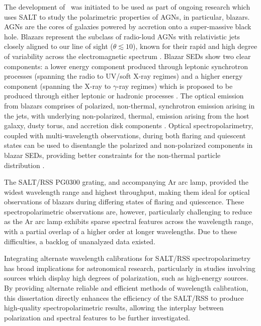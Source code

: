 The development of \stops\ was initiated to be used as part of ongoing research which uses \gls{SALT} to study the polarimetric properties of \glspl{AGN}, in particular, blazars.
\Glspl{AGN} are the cores of galaxies powered by accretion onto a super-massive black hole.
Blazars represent the subclass of radio-loud \glspl{AGN} with relativistic jets closely aligned to our line of sight ($\theta \lesssim 10$\degree), known for their rapid and high degree of variability across the electromagnetic spectrum \citep{Urry_1995}.
Blazar \glspl{SED} show two clear components:
a lower energy component produced through leptonic synchrotron processes (spanning the radio to \gls{UV}/soft X-ray regimes)
and a higher energy component (spanning the X-ray to $\gamma$-ray regimes) which is proposed to be produced through either leptonic or hadronic processes \citep{Bottcher_2013}.
%
The optical emission from blazars comprises of polarized, non-thermal, synchrotron emission arising in the jets, with underlying non-polarized, thermal, emission arising from the host galaxy, dusty torus, and accretion disk components  \citep{Ghisellini_2009}.
Optical spectropolarimetry, coupled with multi-wavelength observations, during both flaring and quiescent states can be used to disentangle the polarized and non-polarized components in blazar \glspl{SED}, providing better constraints for the non-thermal particle distribution \citep{Schutte_COSPAR, Schutte4C0102}.

The \gls{SALT}/\gls{RSS} PG$0300$ grating, and accompanying \gls{Ar} arc lamp, provided the widest wavelength range and highest throughput, making them ideal for optical observations of blazars during differing states of flaring and quiescence.
These spectro\-polarimetric observations are, however, particularly challenging to reduce as the \gls{Ar} arc lamp exhibits sparse spectral features across the wavelength range, with a partial overlap of a higher order at longer wavelengths.
Due to these difficulties, a backlog of unanalyzed data existed.



Integrating alternate wavelength calibrations for \gls{SALT}/\gls{RSS} spectropolarimetry has broad implications for astronomical research, particularly in studies involving sources which display high degrees of polarization, such as high-energy sources.
By providing alternate reliable and efficient methods of wavelength calibration, this dissertation directly enhances the efficiency of the \gls{SALT}/\gls{RSS} to produce high-quality spectropolarimetric results, allowing the interplay between polarization and spectral features to be further investigated.

